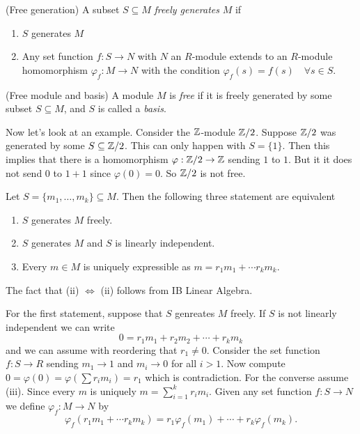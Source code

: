 \documentclass{article}
\begin{document}
\begin{definition}
	(Free generation) A subset $ S\subseteq M $ \textit{freely generates} $ M $ if 
	\begin{enumerate}
		\item $ S $ generates $ M $
		\item Any set function $ f:S\to N $ with $ N $ an $ R $-module extends to an $ R $-module homomorphism $ \varphi_f:M\to N $ with the condition $ \varphi_f(s)=f(s)\quad\forall s\in S $.
	\end{enumerate}
\end{definition}
\begin{definition}
	(Free module and basis) A module $ M $ is \textit{free} if it is freely generated by some subset $ S\subseteq M $, and $ S $ is called a \textit{basis}.
\end{definition}
Now let's look at an example. Consider the $ \mathbb{Z} $-module $ \mathbb{Z}/2 $. Suppose $ \mathbb{Z}/2 $ was generated by some $ S\subseteq \mathbb{Z}/2 $. This can only happen with $ S=\{1\} $. Then this implies that there is a homomorphism $ \varphi:\mathbb{Z}/2\to \mathbb{Z} $ sending $ 1 $ to $ 1 $. But it it does not send $ 0 $ to $ 1+1 $ since $ \varphi(0)=0 $. So $ \mathbb{Z}/2 $ is not free.
\begin{proposition}
	Let $ S=\{m_1,\dots,m_k\}\subseteq M $. Then the following three statement are equivalent
	\begin{enumerate}
		\item $ S $ generates $ M $ freely.
		\item $ S $ generates $ M $ and $ S $ is linearly independent.
		\item Every $ m\in M $ is uniquely expressible as $ m=r_1m_1+\cdots r_km_k $.
	\end{enumerate}
\end{proposition}
\pf The fact that (ii) $ \iff $ (ii) follows from IB Linear Algebra.\par
For the first statement, suppose that $ S $ genreates $ M $ freely. If $ S $ is not linearly independent we can write
\[
  0=r_1m_1+r_2m_2+\cdots +r_km_k
\]
and we can assume with reordering that $ r_1\ne 0 $. Consider the set function $ f:S\to R $ sending $ m_1\to 1 $ and $ m_i\to 0 $ for all $ i>1 $. Now compute $ 0=\varphi(0)=\varphi\left(\sum r_im_i\right)=r_1 $ which is contradiction.
For the converse assume (iii). Since every $ m $ is uniquely $ m=\sum^k_{i=1}r_im_i $. Given any set function $ f:S\to N $ we define $ \varphi_f:M\to N $ by
\[
  \varphi_f(r_1m_1+\cdots r_km_k)=r_1\varphi_f(m_1)+\cdots+r_k\varphi_f(m_k).
\]
\end{document}
